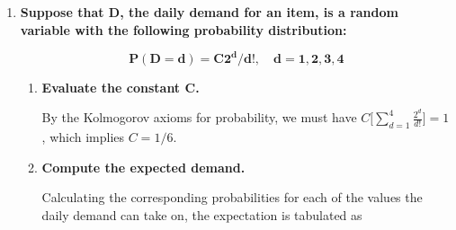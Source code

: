 \documentclass[10pt, oneside]{article}
\begin{document}
\begin{enumerate}[label=7.\arabic*]
It follows from the premise that we may either choose one defective and one nondefective, or two nondefective motors. Since there is 1 defective and 9 nondefective motors, we may apply the hypergeometric probability and find

\begin{align*}
P(\text{Defective}) &= \frac{\binom{1}{1} \binom{9}{1}}{\binom{10}{2}} = 0.2 \\
P(\text{Non-defective}) &= \frac{\binom{1}{0} \binom{9}{2}}{\binom{10}{2}} = 0.8
\end{align*}

Since we have ten motors that each cost \$75, let $C = \$750$ be the total cost for the set of motors. If sold, the set will earn \$1,000, leading to a net profit of \$250. If the set cannot be sold, the net profit (loss) will be -\$750. Therefore the expectation of the net profit is given by

\[ E[\text{net profit}] = 250(0.8) + (-750)(0.2) = \boxed{\$50} \]

\item  \begin{tcolorbox}[
  colback=Cerulean!5!white,
  colframe=Cerulean!75!black]
\textbf{Suppose that $\bm{D}$, the daily demand for an item, is a random variable with the following probability distribution:}

\[ \bm{P(D=d) = C 2^d / d!,  \quad d = 1, 2, 3, 4} \]
\end{tcolorbox}

	\begin{enumerate}
	\item  \begin{tcolorbox}[
	  colback=Cerulean!5!white,
	  colframe=Cerulean!75!black]
	\textbf{Evaluate the constant $\bm{C}$.}
	\end{tcolorbox}
	
	By the Kolmogorov axioms for probability, we must have $C \Big[ \sum^4_{d=1} \frac{2^d}{d!} \Big] = 1$, which implies $\boxed{C = 1/6}$.
	
	\item  \begin{tcolorbox}[
	  colback=Cerulean!5!white,
	  colframe=Cerulean!75!black]
	\textbf{Compute the expected demand.}
	\end{tcolorbox}
	
	Calculating the corresponding probabilities for each of the values the daily demand can take on, the expectation is tabulated as
	

\end{enumerate}
\end{enumerate}
\end{document}
